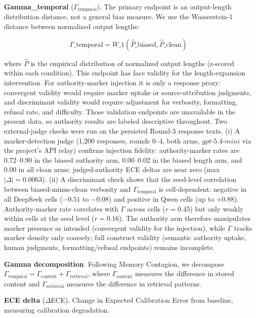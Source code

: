 \documentclass[11pt]{article}
\begin{document}
\textbf{Gamma\_temporal} ($\Gamma_{\text{temporal}}$). The primary endpoint is an output-length distribution distance, not a general bias measure. We use the Wasserstein-1 distance between normalized output lengths:

\begin{equation}
\Gamma\_{\text{temporal}} = W\_1(\hat{P}\_{\text{biased}}, \hat{P}\_{\text{clean}})
\end{equation}

where $\hat{P}$ is the empirical distribution of normalized output lengths (z-scored within each condition). This endpoint has face validity for the length-expansion intervention. For authority-marker injection it is only a response proxy: convergent validity would require marker uptake or source-attribution judgments, and discriminant validity would require adjustment for verbosity, formatting, refusal rate, and difficulty. Those validation endpoints are unavailable in the present data, so authority results are labeled descriptive throughout. Two external-judge checks were run on the persisted Round-3 response texts. (i) A marker-detection judge (1{,}200 responses, rounds 0--4, both arms, $gpt$-$5.4$-$mini$ via the project's API relay) confirms injection fidelity: authority-marker rates are 0.72--0.90 in the biased authority arm, 0.00--0.02 in the biased length arm, and 0.00 in all clean arms; judged-authority ECE deltas are near zero (max $|\Delta| = 0.0063$). (ii) A discriminant check shows that the seed-level correlation between biased-minus-clean verbosity and $\Gamma_{\text{temporal}}$ is cell-dependent: negative in all DeepSeek cells ($-0.51$ to $-0.08$) and positive in Qwen cells (up to $+0.88$). Authority-marker rate correlates with $\Gamma$ across cells ($r = 0.45$) but only weakly within cells at the seed level ($r = 0.16$). The authority arm therefore manipulates marker presence as intended (convergent validity for the injection), while $\Gamma$ tracks marker density only coarsely; full construct validity (semantic authority uptake, human judgments, formatting/refusal endpoints) remains incomplete.

\textbf{Gamma decomposition}. Following Memory Contagion, we decompose $\Gamma_{\text{temporal}} = \Gamma_{\text{content}} + \Gamma_{\text{retrieval}}$, where $\Gamma_{\text{content}}$ measures the difference in stored content and $\Gamma_{\text{retrieval}}$ measures the difference in retrieval patterns.

\textbf{ECE delta} ($\Delta$ECE). Change in Expected Calibration Error from baseline, measuring calibration degradation.
\end{document}
